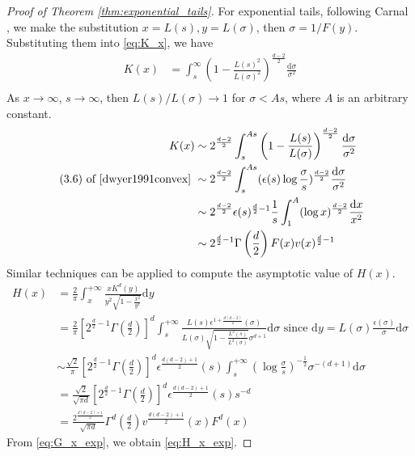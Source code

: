 \documentclass[conference,a4paper]{IEEEtran}
\def\d{\mathrm{d}}
\begin{document}
\begin{proof}[Proof of Theorem \ref{thm:exponential_tails}]
For exponential tails, following Carnal \cite{carnal1970konvexe},
we make
the substitution $x=L(s), y=L(\sigma)$, then $\sigma=1/F(y)$.
Substituting them into \eqref{eq:K_x}, we have
\begin{align*}
    K(x)  & = \int_s^{\infty} \left(1-\frac{L(s)^2}{L(\sigma)^2} \right)^{\frac{d-2}{2}} \frac{\d \sigma}{\sigma^2} \\
\end{align*}
As $x\to \infty$, $s\to \infty$,
then $L(s)/L(\sigma) \to 1$ for $\sigma <As$,
where $A$ is an arbitrary constant.
\begin{align*}
     K(x)& \sim 2^{\frac{d-2}{2}} 
     \int_s^{As} \left(1-\frac{L(s)}{L(\sigma)}\right)^{\frac{d-2}{2}}
     \frac{\d \sigma}{\sigma^2} \\
     \textrm{ (3.6) of \cite{dwyer1991convex} }& 
     \sim  2^{\frac{d-2}{2}}  \int_s^{As} (\epsilon(s) \log\frac{\sigma}{s})^{\frac{d-2}{2}}\frac{\d \sigma}{\sigma^2}\\
     &\sim 2^{\frac{d-2}{2}} \epsilon(s)^{\frac{d}{2}-1} \frac{1}{s} \int_1^{A} (\log x )^{\frac{d-2}{2}}\frac{\d x}{x^2}\\
     & \sim 2^{\frac{d}{2}-1} \Gamma\left(\frac{d}{2}\right)F(x) v(x)^{\frac{d}{2}-1}    
\end{align*}
Similar techniques can be applied to compute the asymptotic value of $H(x)$.
\begin{align*}
    H(x) & = \frac{2}{\pi} \int_x^{+\infty}\frac{x K^d(y)}{y^2 \sqrt{1-\frac{x^2}{y^2}}}\d y\\
    &=\frac{2}{\pi}\left[2^{\frac{d}{2}-1} \Gamma\left(\frac{d}{2}\right)\right]^d
    \int_s^{+\infty}\frac{L(s) \epsilon^{1+\frac{d(d-2)}{2}}(\sigma)}{L(\sigma) \sqrt{1-\frac{L^2(s)}{L^2(\sigma)}}\sigma^{d+1}} \d \sigma
    \textrm{ since } \d y=L(\sigma)\frac{\epsilon(\sigma)}{\sigma}\d \sigma \\
    &\sim  \frac{\sqrt{2}}{\pi}
    \left[2^{\frac{d}{2}-1} \Gamma\left(\frac{d}{2}\right)\right]^d
    \epsilon^{\frac{d(d-2)+1}{2}}(s)
    \int_s^{+\infty} \left(\log\frac{\sigma}{s}
    \right)^{-\frac{1}{2}}
    \sigma^{-(d+1)}\d \sigma \\
    &= \frac{\sqrt{2}}{\sqrt{\pi d}}\left[2^{\frac{d}{2}-1} \Gamma\left(\frac{d}{2}\right)\right]^d
    \epsilon^{\frac{d(d-2)+1}{2}}(s)s^{-d}\\
    &= \frac{2^{\frac{d(d-2)+1}{2}}}{\sqrt{\pi d}}\Gamma^d\left(\frac{d}{2}\right)
    v^{\frac{d(d-2)+1}{2}}(x)F^d(x)
\end{align*}
From \eqref{eq:G_x_exp}, we obtain \eqref{eq:H_x_exp}.


\end{proof}
\end{document}
